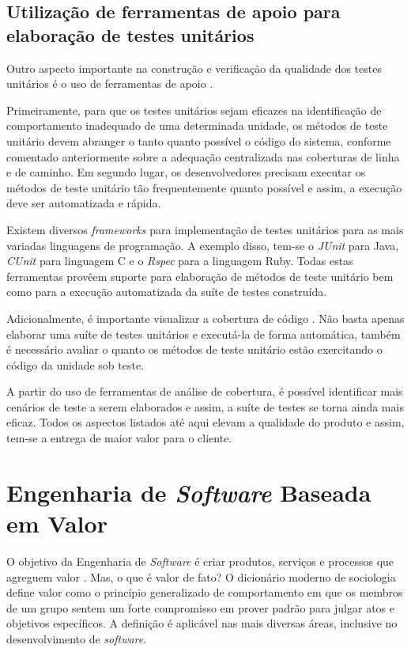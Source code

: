 \subsection{Utilização de ferramentas de apoio para elaboração de testes unitários}

Outro aspecto importante na construção e verificação da qualidade dos testes unitários é o uso de ferramentas de apoio \cite{feedback}.

Primeiramente, para que os testes unitários sejam eficazes na identificação de comportamento inadequado de uma determinada unidade, os métodos de teste unitário devem abranger o tanto quanto possível o código do sistema, conforme comentado anteriormente sobre a adequação centralizada nas coberturas de linha e de caminho. Em segundo lugar, os desenvolvedores precisam executar os métodos de teste unitário tão frequentemente quanto possível e assim, a execução deve ser automatizada e rápida.

Existem diversos \textit{frameworks} para implementação de testes unitários para as mais variadas linguagens de programação. A exemplo disso, tem-se o \textit{JUnit} para Java, \textit{CUnit} para linguagem C e o \textit{Rspec} para a linguagem Ruby. Todas estas ferramentas provêem suporte para elaboração de métodos de teste unitário bem como para a execução automatizada da suíte de testes construída.

Adicionalmente, é importante visualizar a cobertura de código \cite{cobertura}. Não basta apenas elaborar uma suíte de testes unitários e executá-la de forma automática, também é necessário avaliar o quanto os métodos de teste unitário estão exercitando o código da unidade sob teste.

A partir do uso de ferramentas de análise de cobertura, é possível identificar mais cenários de teste a serem elaborados e assim, a suíte de testes se torna ainda mais eficaz. Todos os aspectos listados até aqui elevam a qualidade do produto e assim, tem-se a entrega de maior valor para o cliente.

\section {Engenharia de \textit{Software} Baseada em Valor}

O objetivo da Engenharia de \textit{Software} é criar produtos, serviços e processos que agreguem valor \cite{vbse1}. Mas, o que é valor de fato? O dicionário moderno de sociologia define valor como o princípio generalizado de comportamento em que os membros de um grupo sentem um forte compromisso em prover padrão para julgar atos e objetivos específicos. A definição é aplicável nas mais diversas áreas, inclusive no desenvolvimento de \textit{software}.

